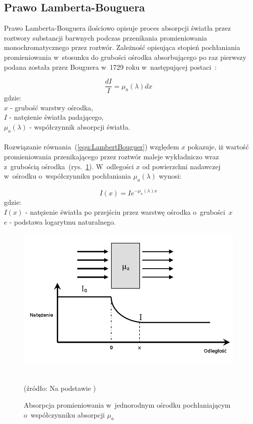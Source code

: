 \subsection{Prawo Lamberta-Bouguera}
\label{subsec:LambertBouguer}
Prawo Lamberta-Bouguera ilościowo opisuje proces absorpcji światła przez roztwory substancji barwnych podczas przenikania promieniowania 
monochromatycznego przez roztwór. Zależność opisująca stopień pochłaniania promieniowania w~stosunku do grubości ośrodka absorbującego po raz 
pierwszy podana została przez Bouguera w~1729 roku w~następującej postaci~\cite{Yavari:PhD:2006}:

\begin{equation}
	\frac{dI}{I} = \mu_{a}(\lambda)dx
	\label{equ:LambertBouguer}
\end{equation}
gdzie:\\
$x$ - grubość warstwy ośrodka,\\
$I$ - natężenie światła padającego,\\
$\mu_{a}(\lambda)$ - współczynnik absorpcji światła.\\\\
Rozwiązanie równania~(\ref{equ:LambertBouguer}) względem $x$ pokazuje, iż wartość promieniowania przenikającego przez roztwór maleje wykładniczo 
wraz z~grubością ośrodka~(rys.~\ref{rys:bouguer}). W~odlegości $x$ od powierzchni nadawczej w~ośrodku o~współczynniku pochłaniania $\mu_{a}(\lambda)$ wynosi:

\begin{equation}
	I(x) = Ie^{-\mu_{a}(\lambda) x}
\end{equation}
gdzie:\\
$I(x)$ - natężenie światła po przejściu przez warstwę ośrodka o~grubości~$x$\\
$e$ - podstawa logarytmu naturalnego.\\

\begin{figure}[ht]
	\centerline{\includegraphics[scale = 0.5]{graphic/bouguer.png}}
	\caption{Absorpcja promieniowania w~jednorodnym ośrodku pochłaniającym o~współczynniku absorpcji $\mu_{a}$}
	~\\
	(źródło: Na podstawie \cite{Yavari:PhD:2006})
	\label{rys:bouguer}
\end{figure}

